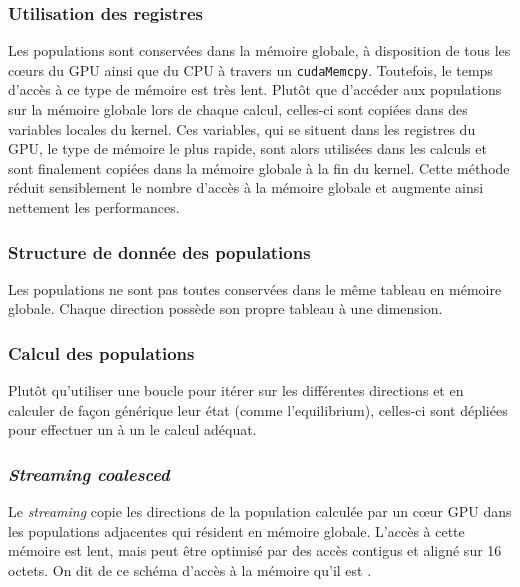 \subsubsection{Utilisation des registres}
Les populations sont conservées dans la mémoire globale, à disposition de tous les cœurs du \acs{GPU} ainsi que du \acs{CPU} à travers un \texttt{cudaMemcpy}. Toutefois, le temps d'accès à ce type de mémoire est très lent. Plutôt que d'accéder aux populations sur la mémoire globale lors de chaque calcul, celles-ci sont copiées dans des variables locales du kernel. Ces variables, qui se situent dans les registres du \acs{GPU}, le type de mémoire le plus rapide, sont alors utilisées dans les calculs et sont finalement copiées dans la mémoire globale à la fin du kernel.
Cette méthode réduit sensiblement le nombre d'accès à la mémoire globale et augmente ainsi nettement les performances.
\subsubsection{Structure de donnée des populations}
Les populations ne sont pas toutes conservées dans le même tableau en mémoire globale. Chaque direction possède son propre tableau à une dimension.

\subsubsection{Calcul des populations}
Plutôt qu'utiliser une boucle pour itérer sur les différentes directions et en calculer de façon générique leur état (comme l'equilibrium), celles-ci sont dépliées pour effectuer un à un le calcul adéquat.

\subsubsection{\textit{Streaming coalesced}}\label{title-streaming-coalesced}
Le \textit{streaming} copie les directions de la population calculée par un cœur \acs{GPU} dans les populations adjacentes qui résident en mémoire globale. L'accès à cette mémoire est lent, mais peut être optimisé par des accès contigus et aligné sur 16 octets. On dit de ce schéma d'accès à la mémoire qu'il est .

